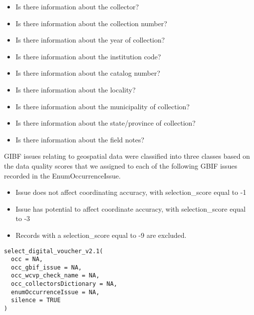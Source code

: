 \documentclass[a4paper]{book}
\begin{document}
\begin{Description}
\begin{itemize}
\item{} Is there information about the collector?
\item{} Is there information about the collection number?
\item{} Is there information about the year of collection?
\item{} Is there information about the institution code?
\item{} Is there information about the catalog number?
\item{} Is there information about the locality?
\item{} Is there information about the municipality of collection?
\item{} Is there information about the state/province of collection?
\item{} Is there information about the field notes?

\end{itemize}


GIBF issues relating to geospatial data were classified into three classes based on the data quality
scores that we assigned to each of the following GBIF issues recorded in the EnumOccurrenceIssue.
\begin{itemize}

\item{} Issue does not affect coordinating accuracy, with selection\_score equal to -1
\item{} Issue has potential to affect coordinate accuracy, with selection\_score equal to -3
\item{} Records with a selection\_score equal to -9 are excluded.

\end{itemize}

\end{Description}
%
\begin{Usage}
\begin{verbatim}
select_digital_voucher_v2.1(
  occ = NA,
  occ_gbif_issue = NA,
  occ_wcvp_check_name = NA,
  occ_collectorsDictionary = NA,
  enumOccurrenceIssue = NA,
  silence = TRUE
)
\end{verbatim}
\end{Usage}
%
\end{document}
